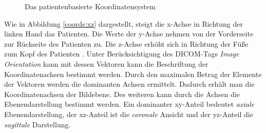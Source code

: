 \begin{figure}[htb]
\centering
{}
\caption{Das patientenbasierte Koordinatensystem}
\label{coords:both}
\end{figure}

Wie in Abbildung \ref{coords:xz} dargestellt, steigt die x-Achse in Richtung der linken Hand das Patienten. Die Werte der y-Achse nehmen von der Vorderseite zur Rückseite des Patienten zu. Die z-Achse erhöht sich in Richtung der Füße zum Kopf des Patienten \cite[C.7.6.2.1.1]{dicom:iod}.
Unter Berücksichtigung des DICOM-Tags \textit{Image Orientation} kann mit dessen Vektoren kann die Beschriftung der Koordinatenachsen bestimmt werden. Durch den maximalen Betrag der Elemente der Vektoren werden die dominanten Achsen ermittelt. Dadurch erhält man die Koordinatenachsen der Bildebene. Des weiteren kann durch die Achsen die Ebenendarstellung bestimmt werden. Ein dominanter xy-Anteil bedeutet \textit{axiale} Ebenendarstellung, der xz-Anteil ist die \textit{coronale} Ansicht und der yz-Anteil die \textit{sagittale} Darstellung.

